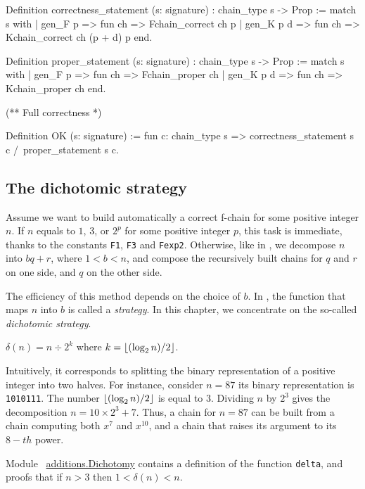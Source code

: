 \begin{Coqsrc}
Definition correctness_statement (s: signature) : 
chain_type s -> Prop :=
match s  with
  | gen_F p => fun ch => Fchain_correct ch p
  | gen_K p d   => fun ch => Kchain_correct ch (p + d) p
end.

Definition proper_statement (s: signature) : 
chain_type s -> Prop :=
match s  with
  | gen_F p => fun ch => Fchain_proper ch 
  | gen_K p d   => fun ch => Kchain_proper ch 
end.

(**  Full correctness *)

Definition  OK (s: signature) 
  := fun c: chain_type s => 
       correctness_statement s c /\
       proper_statement s c.

\end{Coqsrc}

\subsection{The dichotomic strategy}


Assume we want to build automatically a correct  f-chain for some 
positive integer $n$.
If $n$ equals to $1$, $3$, or $2^p$ for some positive integer  $p$,
this task is immediate, thanks to the constants \texttt{F1}, 
\texttt{F3} and \texttt{Fexp2}.
Otherwise, like in \cite{DBLP:journals/ita/BrlekCHM95}, we decompose 
$n$ into $bq+r$, where $1<b<n$, and compose the recursively built
chains for $q$ and $r$ on one side, and $q$ on the other side.

The efficiency of this method depends on the choice of $b$.
In \cite{DBLP:journals/ita/BrlekCHM95}, the function that maps $n$ into $b$
is called a \emph{strategy}. In this chapter, we concentrate
on the so-called \emph{dichotomic strategy}.

$\delta(n) = n \div {2^k}$ where $k=\lfloor(\log_2{n})/2\rfloor$.

Intuitively, it corresponds to splitting the binary representation of a positive
integer into two halves. For instance, consider $n=87$ its binary representation
is \texttt{1010111}. The number $\lfloor(\log_2{n})/2\rfloor$ is equal to $3$.
Dividing $n$ by $2^3$ gives the decomposition $n=10 \times 2^3 + 7$.
Thus, a chain for $n=87$ can be built from a chain computing both $x^7$ and $x^{10}$,
and a chain that raises its argument to its $8-th$ power.


Module ~\href{../theories/html/hydras.additions.Dichotomy.html}{additions.Dichotomy} contains a definition of the function \texttt{delta}, and proofs that if 
$n>3$ then $1<\delta(n)<n$.


